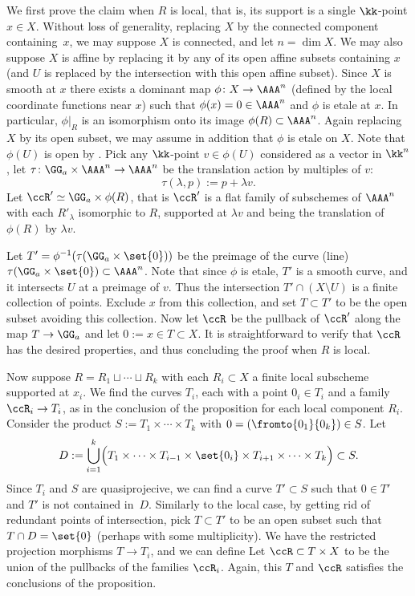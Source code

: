 \documentclass[12pt,a4paper]{article}
\begin{document}
\begin{prf}
   We first prove the claim when $R$ is local, that is,  its support is a single
   $\kk$-point $x\in X$.
   Without loss of generality,
     replacing $X$ by the connected component containing~$x$,
     we may suppose
     $X$ is connected, and let $n=\dim X$.
   We may also suppose $X$ is affine by replacing it by any of its open affine subsets containing $x$ (and $U$ is replaced by the intersection with this open affine subset).
   Since $X$ is smooth at $x$ there exists a dominant map
   $\phi\colon X\to \AAA^n$ (defined by the local coordinate functions near $x$)
   such that $\phi(x)=0\in \AAA^n$ and $\phi$ is etale at $x$.
   In particular, $\phi|_{R}$ is an isomorphism onto its image $\phi(R)\subset \AAA^n$.
   Again replacing $X$ by its open subset, we may assume in addition that $\phi$ is etale on $X$.
   Note that $\phi(U)$ is open by
   \cite[\href{https://stacks.math.columbia.edu/tag/03WT}{Lemma 03WT}]{stacks_project}.
   Pick any $\kk$-point $v\in \phi(U)$ considered as a vector in $\kk^n$,
   let $\tau \colon \GG_a \times \AAA^n \to \AAA^n$ be the translation action by multiples of $v$:
   \[
     \tau (\lambda, p):= p + \lambda v.
   \]
  Let $\ccR' \simeq \GG_a\times \phi(R)$, that is $\ccR'$ is a flat family of subschemes of $\AAA^n$ with each $R'_{\lambda}$ isomorphic to $R$, supported at $\lambda v$ and being the translation of $\phi(R)$ by $\lambda v$.

  Let $T' = \phi^{-1} (\tau(\GG_a \times \set{0}))$
    be the preimage of the curve (line)
    $\tau(\GG_a \times \set{0})\subset \AAA^n$.
  Note that since $\phi$ is etale,
     $T'$ is a smooth curve, and it intersects $U$ at a preimage of $v$.
  Thus the intersection $T'\cap (X\setminus U)$ is a finite collection of points.
  Exclude $x$ from this collection, and set $T\subset T'$ to be the open subset avoiding this collection.
  Now let $\ccR$ be the pullback of $\ccR'$ along the map $T\to \GG_a$ and let $0:=x \in T\subset X$.
  It is straightforward to verify that $\ccR$ has the desired properties, and thus concluding the proof when $R$ is local.

  Now suppose $R = R_1\sqcup \dotsb \sqcup R_k$
  with each $R_i\subset X$ a finite local subscheme supported at $x_i$.
  We find the curves $T_i$, each with a point $0_i\in T_i$ and a family $\ccR_i \to T_i$, as in the conclusion of the proposition for each local component $R_i$.
  Consider the product $S:=T_1\times \dotsb \times T_k$ with
  $0 = (\fromto{0_1}{0_k}) \in S$.
  Let
  \[
    D := \bigcup_{i =1}^{k} \Bigl(T_1\times \dotsb \times  T_{i-1}\times \set{0_i}\times T_{i+1}\times \dotsb \times T_k\Bigr)\subset S.
  \]
  Since $T_i$ and $S$ are quasiprojecive,
    we can find a curve $T'\subset S$ such that
    $0\in T'$ and $T'$ is not contained in~$D$.
  Similarly to the local case, by getting rid of redundant points of intersection,
  pick $T\subset T'$  to be an open subset such that $T\cap D = \set{0}$ (perhaps with some multiplicity).
  We have the restricted projection morphisms $T\to T_i$, and we can define
  Let $\ccR\subset T\times X$ to be the union of the pullbacks of the families $\ccR_i$.
  Again, this $T$ and $\ccR$ satisfies the conclusions of the proposition.
\end{prf}
\end{document}
